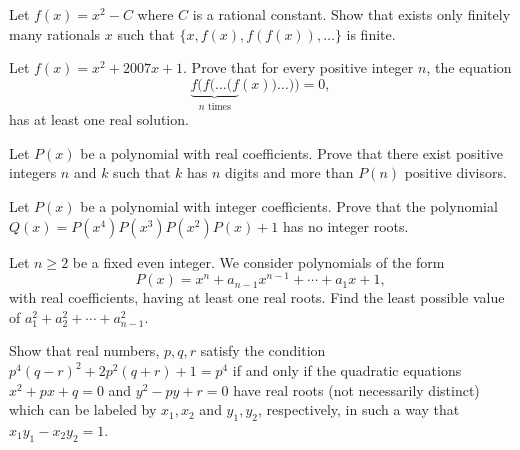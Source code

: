 \documentclass[12pt,a4paper]{memoir}
\theoremstyle{definition}
\begin{document}
\begin{question}[name={1997 Brazil}]
	Let $f(x)= x^2-C$ where $C$ is a rational constant.
	Show that exists only finitely many rationals $x$ such that 
	$\{x,f(x),f(f(x)),\dots\}$ is finite.
\end{question}

\begin{question}[name={2007 Brazil}]
	Let $ f(x) = x^2 + 2007x + 1$. Prove that for every positive integer $ n$, the equation \[\underbrace{f(f(\ldots(f}_{n \text{ times}}(x))\ldots)) = 0,\] has at least one real solution.
\end{question}

\begin{question}[name={2010 Brazil}]
	Let $P(x)$ be a polynomial with real coefficients. Prove that there exist positive integers $n$ and $k$ such that $k$ has $n$ digits and more than $P(n)$ positive divisors.
\end{question}




\begin{question}[name={2000 Czech and Slovak}]
	Let $P(x)$ be a polynomial with integer coefficients. Prove that the polynomial $Q(x) = P(x^4)P(x^3)P(x^2)P(x)+1$ has no integer roots.
\end{question}



\begin{question}[name={2002 Czech and Slovak}]
	Let $n \ge 2$ be a fixed even integer. We consider polynomials of the form \[P(x) = x^n + a_{n-1}x^{n-1} + \cdots + a_1x + 1,\]
	with real coefficients, having at least one real roots. Find the least possible value of $a^2_1 + a^2_2 + \cdots + a^2_{n-1}$.
\end{question}


\begin{question}[name={2004 Czech and Slovak}]
	Show that real numbers, $p, q, r$ satisfy the condition $p^4(q-r)^2 + 2p^2(q+r) + 1 = p^4$ if and only if the quadratic equations $x^2 + px + q = 0$ and $y^2 - py + r = 0$ have real roots (not necessarily distinct) which can be labeled by $x_1,x_2$ and $y_1,y_2$, respectively, in such a way that $x_1y_1 - x_2y_2 = 1$.
\end{question}
\end{document}
